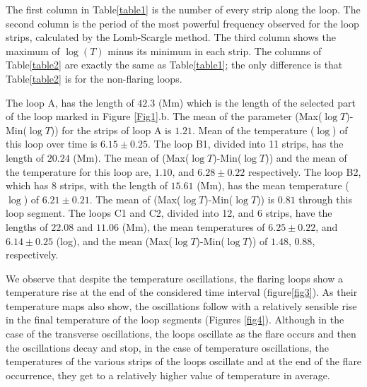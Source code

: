 \documentclass[oneside,onecolumn]{article}
\begin{document}
The first column in Table\ref{table1} is the number of every strip along the loop. The second column is the period of the most powerful frequency observed for the loop strips, calculated by the Lomb-Scargle method. The third column shows the maximum of $\log(T)$ minus its minimum in each strip. The columns of Table\ref{table2} are exactly the same as Table\ref{table1}; the only difference is that Table\ref{table2} is for the non-flaring loops.

The loop A, has the length of $42.3$ (Mm) which is the length of the selected part of the loop marked in Figure \ref{Fig1}.b. The mean of the parameter (Max($\log{T}$)-Min($\log{T}$)) for the strips of loop A is $1.21$. Mean of the temperature ($\log$) of this loop over time is $6.15 \pm 0.25$. The loop B1, divided into 11 strips, has the length of $20.24$ (Mm). The mean of (Max($\log{T}$)-Min($\log{T}$)) and the mean of the temperature for this loop are, $1.10$, and $6.28 \pm 0.22$ respectively. The loop B2, which has 8 strips, with the length of $15.61$ (Mm), has the mean temperature ($\log$) of $6.21 \pm 0.21$. The mean of (Max($\log{T}$)-Min($\log{T}$)) is $0.81$ through this loop segment. The loops C1 and C2, divided into 12, and 6 strips, have the lengths of $22.08$ and $11.06$ (Mm), the mean temperatures of $6.25 \pm 0.22$, and $6.14 \pm 0.25$ (log), and the mean (Max($\log{T}$)-Min($\log{T}$)) of $1.48$, $0.88$, respectively.

We observe that despite the temperature oscillations, the flaring loops show a temperature rise at the end of the considered time interval (figure\ref{fig3}). As their temperature maps also show, the oscillations follow with a relatively sensible rise in the final temperature of the loop segments (Figures \ref{fig4}). Although in the case of the transverse oscillations, the loops oscillate as the flare occurs and then the oscillations decay and stop, in the case of temperature oscillations, the temperatures of the various strips of the loops oscillate and at the end of the flare occurrence, they get to a relatively higher value of temperature in average.  
\end{document}
